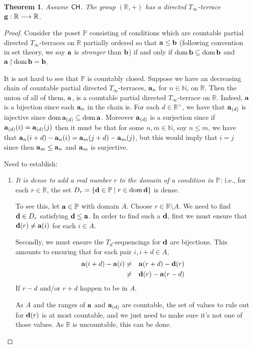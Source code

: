 \documentclass[11pt]{amsart}
\newtheorem{theorem}{Theorem}
\theoremstyle{definition}
\theoremstyle{remark}
\renewcommand{\P}{\mathbb{P}}
\newcommand{\N}{\mathbb{N}}
\newcommand{\R}{\mathbb{R}}
\newcommand{\CH}{\textup{\textsf{CH}}}
\DeclareMathOperator{\dom}{dom}
\newcommand{\st}{\; | \;}
\newcommand{\set}[2]{\left\{#1\st #2 \right\}}
\newcommand{\rest}{\mathbin{\upharpoonright}}
\newcommand{\To}{\longrightarrow}
\renewcommand{\a}{\textup{\textbf{a}}}
\renewcommand{\b}{\textup{\textbf{b}}}
\newcommand{\g}{\textup{\textbf{g}}}
\renewcommand{\d}{\textup{\textbf{d}}}
\begin{document}
\begin{theorem}
Assume $\CH$. The group $(\R, +)$ has a directed $T_\infty$-terrace $\g: \R \To \R$. 
\end{theorem}
\begin{proof}
Consider the poset $\P$ consisting of conditions which are countable partial directed $T_\infty$-terraces on $\R$ partially ordered so that $\a \leq \b$ (following convention in set theory, we say $\a$ is \emph{stronger} than $\b$) if and only if $\dom \b \subseteq \dom \b$ and $\a \rest \dom \b = \b$.

It is not hard to see that $\P$ is countably closed. Suppose we have an decreasing chain of countable partial directed $T_\infty$-terraces, $\a_n$ for $n \in \N$, on $\R$. Then the union of all of them, $\a$, is a countable partial directed $T_\infty$-terrace on $\R$. Indeed, $\a$ is a bijection since each $\a_n$ in the chain is. For each $d \in \R^+$, we have that $\a_{(d)}$ is injective since $\dom\a_{(d)} \subseteq \dom\a$. Moreover $\a_{(d)}$ is a surjection since if $\a_{(d)}(i)=\a_{(d)}(j)$ then it must be that for some $n,m \in \N$, say $n\leq m$, we have that $\a_n(i+d)-\a_n(i)=\a_m(j+d)-\a_m(j)$, but this would imply that $i=j$ since then $\a_m \leq \a_n$ and $\a_m$ is surjective.

Need to establish: \begin{enumerate}

	\item \label{item:DomainDense} \emph{It is dense to add a real number $r$ to the domain of a condition in $\P$:} i.e., for each $r \in \R$, the set $D_r=\set{\d \in \P}{r \in \dom \d }$ is dense. 
	
	To see this, let $\a \in \P$ with domain $A$. Choose $r \in \R \setminus A$. We need to find $\d \in D_r$ satisfying $\d \leq \a$. In order to find such a $\d$, first we must ensure that $\d(r) \neq \a(i)$ for each $i \in A$. 
	
	Secondly, we must ensure the $T_d$-sequencings for $\d$ are bijections. This amounts to ensuring that for each pair $i, i+d \in A$, 
	\begin{eqnarray*}
		\a(i+d)-\a(i) &\neq& \a(r+d)-\d(r) \\
					&\neq& \d(r)-\a(r-d)
	\end{eqnarray*}				
	If $r-d$ and/or $r+d$ happen to be in $A$. 
	
	As $A$ and the ranges of $\a$ and $\a_{(d)}$ are countable, the set of values to rule out for $\d(r)$ is at most countable, and we just need to make sure it's not one of those values. As $\R$ is uncountable, this can be done. \\
	

\end{enumerate}
\end{proof}
\end{document}
